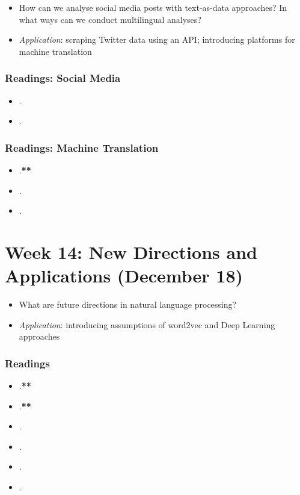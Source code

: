 \documentclass[abstract=on,parskip=full,headings=standardclasses,fontsize=11pt,paper=a4]{scrartcl}
\begin{document}
\begin{itemize}
\renewcommand\labelitemi{--}
\item How can we analyse social media posts with text-as-data approaches? In what ways can we conduct multilingual analyses? 
\item \textit{Application}: scraping Twitter data using an API; introducing platforms for machine translation
\end{itemize}

\subsubsection*{Readings: Social Media}
\begin{itemize}
\item {}.
\item {}.
\end{itemize}

\subsubsection*{Readings: Machine Translation}
\begin{itemize}
\item {}.\textbf{**}
\item {}.
\item {}.
\end{itemize}


\section{Week 14: New Directions and Applications (December 18)}


\begin{itemize}
\renewcommand\labelitemi{--}
\item What are future directions in natural language processing?
\item \textit{Application}: introducing assumptions of word2vec and Deep Learning approaches
\end{itemize}

\subsubsection*{Readings}
\begin{itemize}
\item {}.\textbf{**}
\item {}.\textbf{**}
\item {}.
\item {}.
\item {}.
\item {}.
\end{itemize}
\end{document}
